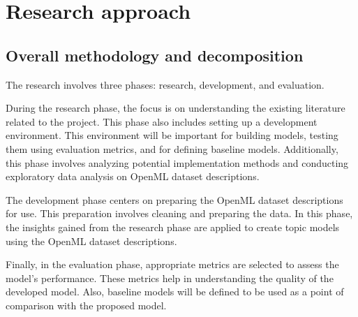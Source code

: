 \documentclass{article}
\begin{document}



\section{Research approach}
\label{sec:approach}
\subsection{Overall methodology and decomposition}

The research involves three phases: research, development, and evaluation.

During the research phase, the focus is on understanding the existing literature related to the project. This phase also includes setting up a development environment. This environment will be important for building models, testing them using evaluation metrics, and for defining baseline models. Additionally, this phase involves analyzing potential implementation methods and conducting exploratory data analysis on OpenML dataset descriptions.

The development phase centers on preparing the OpenML dataset descriptions for use. This preparation involves cleaning and preparing the data. In this phase, the insights gained from the research phase are applied to create topic models using the OpenML dataset descriptions.

Finally, in the evaluation phase, appropriate metrics are selected to assess the model's performance. These metrics help in understanding the quality of the developed model. Also, baseline models will be defined to be used as a point of comparison with the proposed model.
\end{document}
